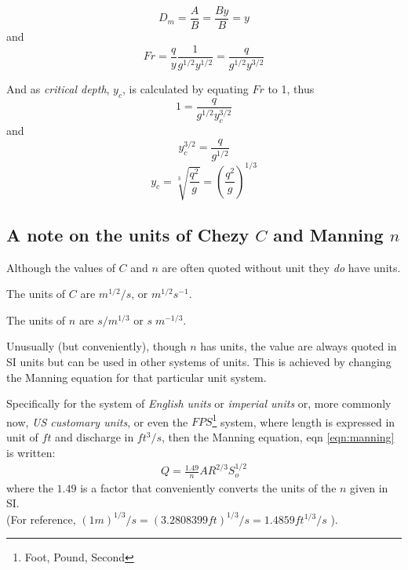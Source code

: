 \documentclass[a4paper, 12pt, british]{article} %
\numberwithin{equation}{section}
\numberwithin{figure}{section}
\numberwithin{table}{section}
\begin{document}
	\begin{equation*}
	D_m = \frac{A}{B}=\frac{By}{B}=y
	\end{equation*}
	and
	\begin{equation}
	Fr  =\frac{q}{y} \frac{1}{g^{1/2}y^{1/2}}
	=\frac{q}{g^{1/2}y^{3/2}}
	\end{equation}
	
	And as \textit{critical depth}, $y_c$, is calculated by equating $Fr$ to 1, thus
	\begin{equation*}
	1 =\frac{q}{g^{1/2}y_{c}^{3/2}}
	\end{equation*}
	and
	\begin{equation*}
	y_{c}^{3/2} = \frac{q}{g^{1/2}}
	\end{equation*}
	\begin{equation}
	y_{c} = \sqrt[3]{\frac{q^2}{g}} = \left(\frac{q^2}{g}\right)^{1/3} 
	\end{equation}
	
	\subsection*{A note on the units of Chezy $C$ and  Manning $n$}
	
	Although the values of $C$ and $n$ are often quoted without unit they \textit{do} have units. 
	
	The units of $C$ are $m^{1/2}/s$, or $m^{1/2}s^{-1}$.
	
	The units of $n$ are $s / m^{1/3}$ or $s \; m^{-1/3}$.
	
	Unusually (but conveniently), though  $n$ has units, the value are always quoted in SI units but can be used in other systems of units. This is achieved by changing the Manning equation for that particular unit system. 
	
	Specifically for the system of \textit{English units} or \textit{imperial units} or, more commonly now, \textit{US customary units}, or even the $FPS$\footnote{Foot, Pound, Second} system,  where length is expressed in unit of $ft$ and discharge in $ft^3/s$, then  the Manning equation, eqn \ref{eqn:manning} is written: 
	\begin{align}
	Q = \frac{1.49}{n}AR^{2/3}S_o^{1/2}
	\label{eqn:manning_us}
	\end{align}
	where the $1.49$ is a factor that conveniently converts the units of the $n$ given in SI.\\
	(For reference, $(1 m)^{1/3}/s = (3.2808399 ft)^{1/3}/s = 1.4859 ft^{1/3}/s$ ).
	
\end{document}

